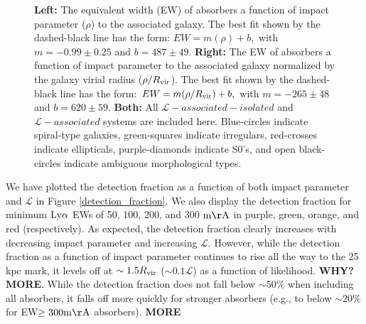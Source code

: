 \documentclass[twocolumn,tighten]{aastex62}
\begin{document}
\begin{figure}[ht!]
        \centering
        \vspace{0pt}
        \caption{\small{\textbf{Left: } The equivalent width (EW) of absorbers a function of impact parameter ($\rho$) to the associated galaxy. The best fit shown by the dashed-black line has the form: $EW = m (\rho) + b,$ with $m = -0.99 \pm 0.25$ and $b = 487 \pm 49$. \textbf{Right:} The EW of absorbers a function of impact parameter to the associated galaxy normalized by the galaxy virial radius ($\rho / R_{\rm vir}$). The best fit shown by the dashed-black line has the form: $EW = m (\rho / R_{\rm vir}) + b,$ with $m = -265 \pm 48$ and $b = 620 \pm 59$. \textbf{Both:} All $\mathcal{L}-associated-isolated$ and $\mathcal{L}-associated$ systems are included here. Blue-circles indicate spiral-type galaxies, green-squares indicate irregulars, red-crosses indicate ellipticals, purple-diamonds indicate S0's, and open black-circles indicate ambiguous morphological types. }}
        \vspace{5pt}
        \label{ew_both}
\end{figure}

We have plotted the detection fraction as a function of both impact parameter and $\mathcal{L}$ in Figure \ref{detection_fraction}. We also display the detection fraction for minimum $\rm Ly\alpha$ EWs of 50, 100, 200, and 300 $\rm m\AA$ in purple, green, orange, and red (respectively). As expected, the detection fraction clearly increases with decreasing impact parameter and increasing $\mathcal{L}$. However, while the detection fraction as a function of impact parameter continues to rise all the way to the 25 kpc mark, it levels off at $\sim 1.5 R_{\rm vir}$ ($\sim 0.1 \mathcal{L}$) as a function of likelihood. \textbf{WHY? MORE}. While the detection fraction does not fall below $\sim 50\%$ when including all absorbers, it falls off more quickly for stronger absorbers (e.g., to below $\sim 20\%$ for EW$\rm \ge 300 m\AA$ absorbers). \textbf{MORE}
\end{document}
